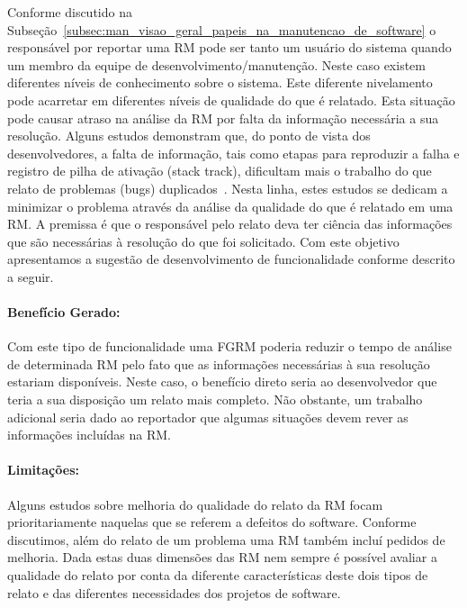 Conforme discutido na
Subseção~\ref{subsec:man_visao_geral_papeis_na_manutencao_de_software} o
responsável por reportar uma RM pode ser tanto um usuário do sistema quando um
membro da equipe de desenvolvimento/manutenção. Neste caso existem diferentes
níveis de conhecimento sobre o sistema. Este diferente nivelamento pode
acarretar em diferentes níveis de qualidade do que é relatado. Esta situação
pode causar atraso na análise da RM por falta da informação necessária a sua
resolução. Alguns estudos demonstram que, do ponto de vista dos desenvolvedores,
a falta de informação, tais como etapas para reproduzir a falha e registro de
pilha de ativação (stack track), dificultam mais o trabalho do que relato de
problemas (bugs) duplicados~\cite{bettenburg2008makes, bettenburg2007quality}.
Nesta linha, estes estudos se dedicam a minimizar o problema através da análise
da qualidade do que é relatado em uma RM\@. A premissa é que o responsável pelo
relato deva ter ciência das informações que são necessárias à resolução do que
foi solicitado. Com este objetivo apresentamos a sugestão de desenvolvimento de
funcionalidade conforme descrito a seguir.

\paragraph{Benefício Gerado:}
\label{par:beneficio_s01}

Com este tipo de funcionalidade uma FGRM poderia
reduzir o tempo de análise de determinada RM pelo fato que as informações
necessárias à sua resolução estariam disponíveis. Neste caso, o benefício direto
seria ao desenvolvedor que teria a sua disposição um relato mais completo. Não
obstante, um trabalho adicional seria dado ao reportador que algumas situações
devem rever as informações incluídas na RM.

\paragraph{Limitações:}
\label{par:limitacoes_s01}

Alguns estudos sobre melhoria do qualidade do relato da RM focam
prioritariamente naquelas que se referem a defeitos do software. Conforme
discutimos, além do relato de um problema uma RM também incluí pedidos de
melhoria. Dada estas duas dimensões das RM nem sempre é possível avaliar a
qualidade do relato por conta da diferente características deste dois tipos de
relato e das diferentes necessidades dos projetos de software.

